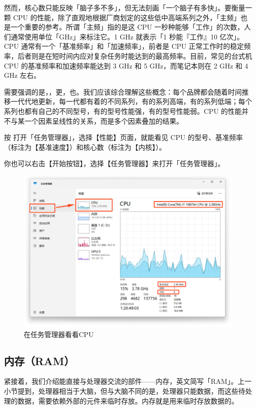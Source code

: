 然而，核心数只能反映「脑子多不多」，但无法刻画「一个脑子有多快」。要衡量一颗 CPU 的性能，除了直观地根据厂商划定的这些低中高端系列之外，「主频」也是一个重要的参考。所谓「主频」指的是这 CPU 一秒种能够「工作」的次数，人们通常使用单位「GHz」来标注它。1 GHz 就表示「1 秒能『工作』10 亿次」。CPU 通常有一个「基准频率」和「加速频率」，前者是 CPU 正常工作时的稳定频率，后者则是在短时间内应对复杂任务时能达到的最高频率。目前，常见的台式机 CPU 的基准频率和加速频率能达到 3 GHz 和 5 GHz，而笔记本则在 2 GHz 和 4 GHz 左右。

需要强调的是，，更，也。我们应该综合理解这些概念：每个品牌都会随着时间推移一代代地更新，每一代都有着的不同系列，有的系列高端，有的系列低端；每个系列也都有自己的不同型号，有的型号性能强，有的型号性能弱。CPU 的性能并不与某一个因素呈线性的关系，而是多个因素叠加的结果。

按  打开「任务管理器」，选择【性能】页面，就能看见 CPU 的型号、基准频率（标注为【基准速度】）和核心数（标注为【内核】）。

\begin{note}
  你也可以右击【开始按钮】，选择【任务管理器】来打开「任务管理器」。
\end{note}

\begin{figure}[htb!]
  \centering
  \includegraphics[width=.65\textwidth]{assets/basic/Check_CPU.png}
  \caption{在任务管理器看看CPU}
  \label{fig:Check_CPU}
\end{figure}

\subsection{内存（RAM）}

紧接着，我们介绍能直接与处理器交流的部件——内存，英文简写「RAM」。上一小节提到，处理器相当于大脑，但与大脑不同的是，处理器只能数据，而这些待处理的数据，需要依赖外部的元件来临时存放。内存就是用来临时存放数据的。

